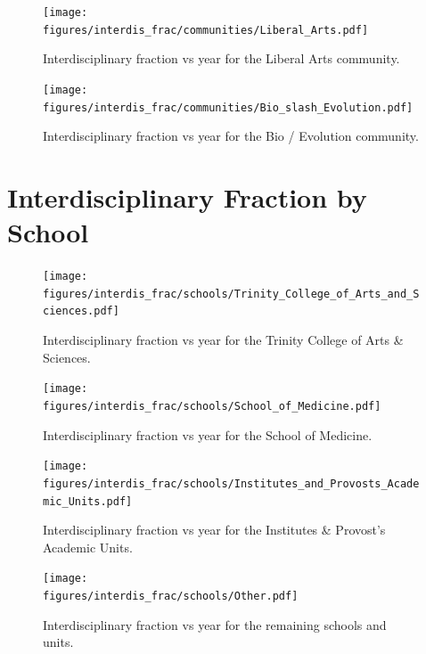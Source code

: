 \documentclass[notitlepage,aps,prd,nofootinbib]{revtex4-1}
\newcommand{\figures}{../outputs/plots}
\begin{document}
\begin{figure}[!htb]\centering
  \texttt{[image: \\figures/interdis\_frac/communities/Liberal\_Arts.pdf]}
  \caption{Interdisciplinary fraction vs year for the Liberal Arts community.}
\end{figure}

\begin{figure}[!htb]\centering
  \texttt{[image: \\figures/interdis\_frac/communities/Bio\_slash\_Evolution.pdf]}
  \caption{Interdisciplinary fraction vs year for the Bio / Evolution community.}
\end{figure}


\appendix*
\section{Interdisciplinary Fraction by School}

\begin{figure}[!htb]\centering
  \texttt{[image: \\figures/interdis\_frac/schools/Trinity\_College\_of\_Arts\_and\_Sciences.pdf]}
  \caption{Interdisciplinary fraction vs year for the Trinity College of Arts \& Sciences.}
\end{figure}

\begin{figure}[!htb]\centering
  \texttt{[image: \\figures/interdis\_frac/schools/School\_of\_Medicine.pdf]}
  \caption{Interdisciplinary fraction vs year for the School of Medicine.}
\end{figure}

\begin{figure}[!htb]\centering
  \texttt{[image: \\figures/interdis\_frac/schools/Institutes\_and\_Provosts\_Academic\_Units.pdf]}
  \caption{Interdisciplinary fraction vs year for the Institutes \& Provost's Academic Units.}
\end{figure}

\begin{figure}[!htb]\centering
  \texttt{[image: \\figures/interdis\_frac/schools/Other.pdf]}
  \caption{Interdisciplinary fraction vs year for the remaining schools and units.}
\end{figure}
\end{document}
